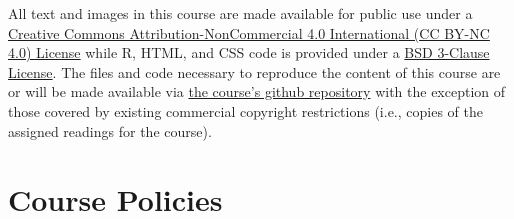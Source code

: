 \documentclass[12pt,]{article}
\begin{document}
All text and images in this course are made available for public use
under a \href{https://creativecommons.org/licenses/by-nc/4.0/}{Creative
Commons Attribution-NonCommercial 4.0 International (CC BY-NC 4.0)
License} while R, HTML, and CSS code is provided under a
\href{https://github.com/ajnafa/PSCI-3300-Political-Research-Methods-SP23/blob/main/LICENSE}{BSD
3-Clause License}. The files and code necessary to reproduce the content
of this course are or will be made available via
\href{https://github.com/ajnafa/PSCI-3300-Political-Research-Methods-SP23/}{the
course's github repository} with the exception of those covered by
existing commercial copyright restrictions (i.e., copies of the assigned
readings for the course).

\hypertarget{course-policies}{%
\section{Course Policies}\label{course-policies}}
\end{document}
